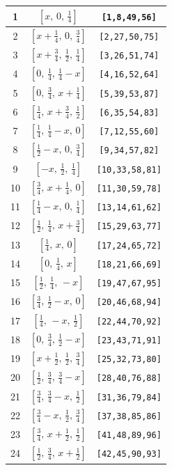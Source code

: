 \documentclass[fleqn,8pt]{jsarticle}
\begin{document}
\begin{longtable}{ccc}
1 & $\left[ x,\, 0,\, \frac{1}{4} \right]$ & {\tt [1,8,49,56]} \\ \hline
2 & $\left[ x + \frac{1}{4},\, 0,\, \frac{3}{4} \right]$ & {\tt [2,27,50,75]} \\ \hline
3 & $\left[ x + \frac{3}{4},\, \frac{1}{2},\, \frac{1}{4} \right]$ & {\tt [3,26,51,74]} \\ \hline
4 & $\left[ 0,\, \frac{1}{4},\, \frac{1}{4} - x \right]$ & {\tt [4,16,52,64]} \\ \hline
5 & $\left[ 0,\, \frac{3}{4},\, x + \frac{1}{4} \right]$ & {\tt [5,39,53,87]} \\ \hline
6 & $\left[ \frac{1}{4},\, x + \frac{3}{4},\, \frac{1}{2} \right]$ & {\tt [6,35,54,83]} \\ \hline
7 & $\left[ \frac{1}{4},\, \frac{1}{4} - x,\, 0 \right]$ & {\tt [7,12,55,60]} \\ \hline
8 & $\left[ \frac{1}{2} - x,\, 0,\, \frac{3}{4} \right]$ & {\tt [9,34,57,82]} \\ \hline
9 & $\left[ - x,\, \frac{1}{2},\, \frac{1}{4} \right]$ & {\tt [10,33,58,81]} \\ \hline
10 & $\left[ \frac{3}{4},\, x + \frac{1}{4},\, 0 \right]$ & {\tt [11,30,59,78]} \\ \hline
11 & $\left[ \frac{1}{4} - x,\, 0,\, \frac{1}{4} \right]$ & {\tt [13,14,61,62]} \\ \hline
12 & $\left[ \frac{1}{2},\, \frac{1}{4},\, x + \frac{3}{4} \right]$ & {\tt [15,29,63,77]} \\ \hline
13 & $\left[ \frac{1}{4},\, x,\, 0 \right]$ & {\tt [17,24,65,72]} \\ \hline
14 & $\left[ 0,\, \frac{1}{4},\, x \right]$ & {\tt [18,21,66,69]} \\ \hline
15 & $\left[ \frac{1}{2},\, \frac{1}{4},\, - x \right]$ & {\tt [19,47,67,95]} \\ \hline
16 & $\left[ \frac{3}{4},\, \frac{1}{2} - x,\, 0 \right]$ & {\tt [20,46,68,94]} \\ \hline
17 & $\left[ \frac{1}{4},\, - x,\, \frac{1}{2} \right]$ & {\tt [22,44,70,92]} \\ \hline
18 & $\left[ 0,\, \frac{3}{4},\, \frac{1}{2} - x \right]$ & {\tt [23,43,71,91]} \\ \hline
19 & $\left[ x + \frac{1}{2},\, \frac{1}{2},\, \frac{3}{4} \right]$ & {\tt [25,32,73,80]} \\ \hline
20 & $\left[ \frac{1}{2},\, \frac{3}{4},\, \frac{3}{4} - x \right]$ & {\tt [28,40,76,88]} \\ \hline
21 & $\left[ \frac{3}{4},\, \frac{3}{4} - x,\, \frac{1}{2} \right]$ & {\tt [31,36,79,84]} \\ \hline
22 & $\left[ \frac{3}{4} - x,\, \frac{1}{2},\, \frac{3}{4} \right]$ & {\tt [37,38,85,86]} \\ \hline
23 & $\left[ \frac{3}{4},\, x + \frac{1}{2},\, \frac{1}{2} \right]$ & {\tt [41,48,89,96]} \\ \hline
24 & $\left[ \frac{1}{2},\, \frac{3}{4},\, x + \frac{1}{2} \right]$ & {\tt [42,45,90,93]} \\
\end{longtable}
\end{document}
